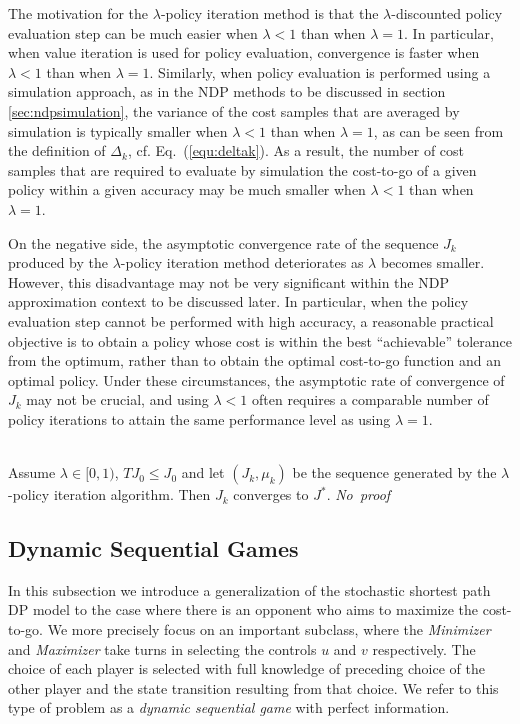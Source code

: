 The motivation for the $\lambda$-policy iteration method is that the $\lambda$-discounted policy evaluation step can be much easier when $\lambda < 1$ than when $\lambda = 1$. In particular, when value iteration is used for policy evaluation, convergence is faster when $\lambda < 1$ than when $\lambda = 1$. Similarly, when policy evaluation is performed using a simulation approach, as in the NDP methods to be discussed in section \ref{sec:ndpsimulation}, the variance of the cost samples that are averaged by simulation is typically smaller when $\lambda < 1$ than when $\lambda = 1$, as can be seen from the definition of $\Delta_k$, cf. Eq.~(\ref{equ:deltak}). As a result, the number of cost samples that are required to evaluate by simulation the cost-to-go of a given policy within a given accuracy may be much smaller when $\lambda < 1$ than when $\lambda = 1$.

On the negative side, the asymptotic convergence rate of the sequence $J_k$ produced by the $\lambda$-policy iteration method deteriorates as $\lambda$ becomes smaller. However, this disadvantage may not be very significant within the NDP approximation context to be discussed later. In particular, when the policy evaluation step cannot be performed with high accuracy, a reasonable practical objective is to obtain a policy whose cost is within the best ``achievable'' tolerance from the optimum, rather than to obtain the optimal cost-to-go function and an optimal policy. Under these circumstances, the asymptotic rate of convergence of $J_k$ may not be crucial, and using $\lambda < 1$ often requires a comparable number of policy iterations to attain the same performance level as using $\lambda = 1$.

\begin{theorem} \hfill \\
Assume $\lambda \in [0,1)$, $TJ_0 \leq J_0$ and let $(J_k,\mu_k)$ be the sequence generated by the $\lambda$-policy iteration algorithm. Then $J_k$ converges to $J^*$. \hfill {\it No~proof}
\end{theorem}

\subsection{Dynamic Sequential Games}
\label{sec:dynamic:games}
In this subsection we introduce a generalization of the stochastic shortest path DP model to the case where there is an opponent who aims to maximize the cost-to-go. We more precisely focus on an important subclass, where the \emph{Minimizer} and \emph{Maximizer} take turns in selecting the controls $u$ and $v$ respectively. The choice of each player is selected with full knowledge of preceding choice of the other player and the state transition resulting from that choice. We refer to this type of problem as a \emph{dynamic sequential game} with perfect information.

